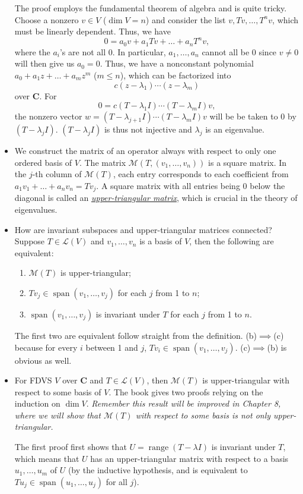 \documentclass[11pt]{article}
\newcommand{\df}[1]{\ul{\textit{\textsf{#1}}}}
\newcommand{\C}{\mathbf{C}}
\newcommand{\s}{\operatorname{span}}
\renewcommand{\r}{\operatorname{range}}
\renewcommand{\d}{\dim}
\newcommand{\LV}{\mathcal{L}(V)}
\newcommand{\M}{\mathcal{M}}
\begin{document}
\begin{itemize}
    The proof employs the fundamental theorem of algebra and is quite tricky. Choose a nonzero $v \in V$ ($\d V=n$) and consider the list $v, Tv, \dots, T^n v$, which must be linearly dependent. Thus, we have $$0 = a_0 v + a_1 Tv + \dots + a_n T^n v,$$ where the $a_i$'s are not all $0$. In particular, $a_1, \dots, a_n$ cannot all be 0 since $v \not= 0$ will then give us $a_0 = 0$. Thus, we have a nonconstant polynomial $a_0+a_1 z+\dots+a_m z^m$ ($m \leq n$), which can be factorized into $$c(z - \lambda_1)\cdots(z - \lambda_m)$$ over $\C$. For $$0=c(T - \lambda_1 I)\cdots(T - \lambda_m I)v,$$ the nonzero vector $w = (T - \lambda_{j+1} I) \cdots (T - \lambda_m I)v$ will be be taken to 0 by $(T - \lambda_j I)$. $(T - \lambda_j I)$ is thus not injective and $\lambda_j$ is an eigenvalue.
    \item We construct the matrix of an operator always with respect to only one ordered basis of $V$. The matrix $\M(T,(v_1,\dots,v_n))$ is a square matrix. In the $j$-th column of $\M(T)$, each entry corresponds to each coefficient from $a_1v_1+\dots+a_nv_n = Tv_j$. A square matrix with all entries being 0 below the diagonal is called an \df{upper-triangular matrix}, which is crucial in the theory of eigenvalues.
    \item How are invariant subspaces and upper-triangular matrices connected? Suppose $T \in \LV$ and $v_1,\dots,v_n$ is a basis of $V$, then the following are equivalent:
    \begin{enumerate}[label=(\alph*)]
        \item $\M(T)$ is upper-triangular;
        \item $Tv_j \in \s(v_1,\dots,v_j)$ for each $j$ from 1 to $n$;
        \item $\s(v_1,\dots,v_j)$ is invariant under $T$ for each $j$ from 1 to $n$.
    \end{enumerate}
    The first two are equivalent follow straight from the definition. (b)$\implies$(c) because for every $i$ between 1 and $j$, $Tv_i \in \s(v_1,\dots,v_j)$. (c)$\implies$(b) is obvious as well.
    \item For FDVS $V$ over $\C$ and $T \in \LV$, then $\M(T)$ is upper-triangular with respect to some basis of $V$. The book gives two proofs relying on the induction on $\d V$. \emph{Remember this result will be improved in Chapter 8, where we will show that $\M(T)$ with respect to some basis is not only upper-triangular.}
    
    The first proof first shows that $U = \r(T - \lambda I)$ is invariant under $T$, which means that $U$ has an upper-triangular matrix with respect to a basis $u_1,\dots,u_m$ of $U$ (by the inductive hypothesis, and is equivalent to $Tu_j \in \s(u_1,\dots,u_j)$ for all $j$).
    

\end{itemize}
\end{document}
